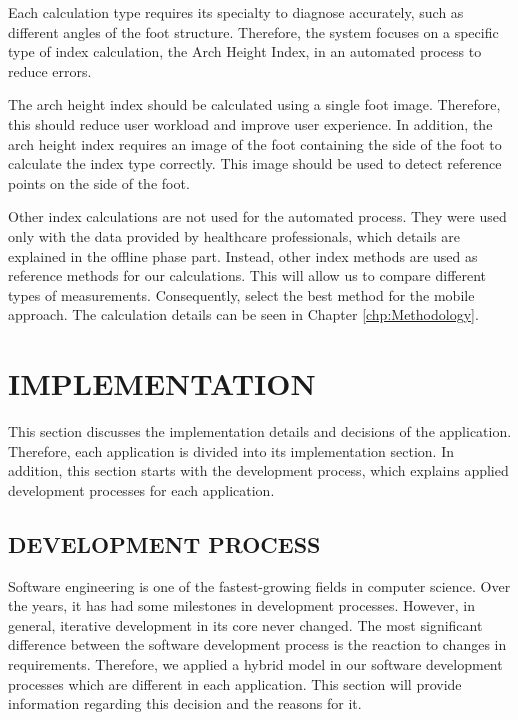 Each calculation type requires its specialty to diagnose accurately, such as different angles of the foot structure. Therefore, the system focuses on a specific type of index calculation, the Arch Height Index, in an automated process to reduce errors. 

The arch height index should be calculated using a single foot image. Therefore, this should reduce user workload and improve user experience. In addition, the arch height index requires an image of the foot containing the side of the foot to calculate the index type correctly. This image should be used to detect reference points on the side of the foot. 

Other index calculations are not used for the automated process. They were used only with the data provided by healthcare professionals, which details are explained in the offline phase part. Instead, other index methods are used as reference methods for our calculations. This will allow us to compare different types of measurements. Consequently, select the best method for the mobile approach. The calculation details can be seen in Chapter \ref{chp:Methodology}.

\section{IMPLEMENTATION}\label{sec:StudyIImplementation}

This section discusses the implementation details and decisions of the application. Therefore, each application is divided into its implementation section. In addition, this section starts with the development process, which explains applied development processes for each application.

\subsection{DEVELOPMENT PROCESS}

Software engineering is one of the fastest-growing fields in computer science. Over the years, it has had some milestones in development processes. However, in general, iterative development in its core never changed. The most significant difference between the software development process is the reaction to changes in requirements. Therefore, we applied a hybrid model in our software development processes which are different in each application. This section will provide information regarding this decision and the reasons for it.

